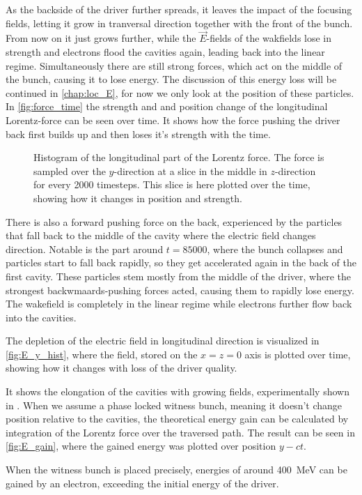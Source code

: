 \documentclass[bachelor_thesis]{subfiles}
\begin{document}
As the backside of the driver further spreads, it leaves the impact of the focusing fields, letting it grow in tranversal direction together with the front of the bunch. From now on it just grows further, while the $\vec{E}$-fields of the wakfields lose in strength and electrons flood the cavities again, leading back into the linear regime.
Simultaneously there are still strong forces, which act on the middle of the bunch, causing it to lose energy. The discussion of this energy loss will be continued in \autoref{chap:loc_E}, for now we only look at the position of these particles.
In \autoref{fig:force_time} the strength and and position change of the longitudinal Lorentz-force can be seen over time. It shows how the force pushing the driver back first builds up and then loses it's strength with the time.
\begin{figure}
	\centering
	\missingfigure{}
	\caption{Histogram of the longitudinal part of the Lorentz force. The force is sampled over the $y$-direction at a slice in the middle in $z$-direction for every 2000 timesteps. This slice is here plotted over the time, showing how it changes in position and strength.}
	\label{fig:force_time}
\end{figure}
There is also a forward pushing force on the back, experienced by the particles that fall back to the middle of the cavity where the electric field changes direction. Notable is the part around $t=85000$, where the bunch collapses and particles start to fall back rapidly,
so they get accelerated again in the back of the first cavity. These particles stem mostly from the middle of the driver, where the strongest backwmaards-pushing forces acted, causing them to rapidly lose energy.
The wakefield is completely in the linear regime while electrons further flow back into the cavities.

The depletion of the electric field in longitudinal direction is visualized in \autoref{fig:E_y_hist}, where the field, stored on the $x=z=0$ axis is plotted over time, showing how it changes with loss of the driver quality.
\begin{figure}
	\centering
	\missingfigure{}
	\caption{}
	\label{fig:E_y_hist}
\end{figure}
It shows the elongation of the cavities with growing fields, experimentally shown in \cite{Schoebel2022}. When we assume a phase locked witness bunch, meaning it doesn't change position relative to the cavities, the theoretical energy gain can be calculated 
by integration of the Lorentz force over the traversed path. The result can be seen in \autoref{fig:E_gain}, where the gained energy was plotted over position $y-ct$.
\begin{figure}
	\centering
	\caption{}
	\label{fig:E_gain}
\end{figure}
When the witness bunch is placed precisely, energies of around \qty{400}{\MeV} can be gained by an electron, exceeding the initial energy of the driver.
\end{document}
